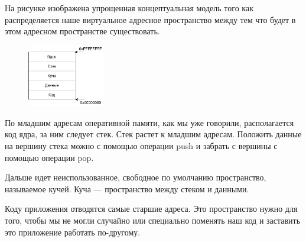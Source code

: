 На рисунке изображена упрощенная концептуальная модель того как распределяется наше виртуальное адресное пространство между тем что будет в этом адресном пространстве существовать.

\begin{figure}[htbp]
  \centering
  \includegraphics[width=0.3\textwidth]{./memory/memory-model/memory-model.png}
\end{figure}

По младшим адресам оперативной памяти, как мы уже говорили, располагается код ядра, за ним следует стек. Стек растет к младшим адресам. Положить данные на вершину стека можно с помощью операции push и забрать с вершины с помощью операции pop.

Дальше идет неиспользованное, свободное по умолчанию пространство, называемое кучей. Куча --- пространство между стеком и данными.

Коду приложения отводятся самые старшие адреса. Это пространство нужно для того, чтобы мы не могли случайно или специально поменять наш код и заставить это приложение работать по-другому.